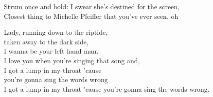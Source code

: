 \begin{multicols}{2}
Strum once and hold:
I swear she's destined for the screen,\\
Closest thing to Michelle Pfeiffer that you've ever seen, oh\\




Lady, running down to the riptide,\\
taken away to the dark side,\\
I wanna be your left hand man.\\
I love you when you're singing that song and,\\
I got a lump in my throat 'cause\\
you're gonna sing the words wrong\\
I got a lump in my throat 'cause you're gonna sing the words wrong.\\

\end{multicols}